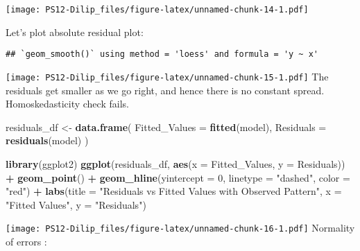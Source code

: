 \documentclass[
]{article}
\newenvironment{Shaded}{\begin{snugshade}}{\end{snugshade}}
\newcommand{\AttributeTok}[1]{\textcolor[rgb]{0.13,0.29,0.53}{#1}}
\newcommand{\DecValTok}[1]{\textcolor[rgb]{0.00,0.00,0.81}{#1}}
\newcommand{\FunctionTok}[1]{\textcolor[rgb]{0.13,0.29,0.53}{\textbf{#1}}}
\newcommand{\NormalTok}[1]{#1}
\newcommand{\OtherTok}[1]{\textcolor[rgb]{0.56,0.35,0.01}{#1}}
\newcommand{\SpecialCharTok}[1]{\textcolor[rgb]{0.81,0.36,0.00}{\textbf{#1}}}
\newcommand{\StringTok}[1]{\textcolor[rgb]{0.31,0.60,0.02}{#1}}
\begin{document}
\texttt{[image: PS12-Dilip\_files/figure-latex/unnamed-chunk-14-1.pdf]}

Let's plot absolute residual plot:

\begin{Shaded}
\end{Shaded}

\begin{verbatim}
## `geom_smooth()` using method = 'loess' and formula = 'y ~ x'
\end{verbatim}

\texttt{[image: PS12-Dilip\_files/figure-latex/unnamed-chunk-15-1.pdf]}
The residuals get smaller as we go right, and hence there is no constant
spread. Homoskedasticity check fails.

\begin{Shaded}
\begin{Highlighting}[]
\NormalTok{residuals\_df }\OtherTok{\textless{}{-}} \FunctionTok{data.frame}\NormalTok{(}
  \AttributeTok{Fitted\_Values =} \FunctionTok{fitted}\NormalTok{(model),}
  \AttributeTok{Residuals =} \FunctionTok{residuals}\NormalTok{(model)}
\NormalTok{)}

\FunctionTok{library}\NormalTok{(ggplot2)}
\FunctionTok{ggplot}\NormalTok{(residuals\_df, }\FunctionTok{aes}\NormalTok{(}\AttributeTok{x =}\NormalTok{ Fitted\_Values, }\AttributeTok{y =}\NormalTok{ Residuals)) }\SpecialCharTok{+}
  \FunctionTok{geom\_point}\NormalTok{() }\SpecialCharTok{+}
  \FunctionTok{geom\_hline}\NormalTok{(}\AttributeTok{yintercept =} \DecValTok{0}\NormalTok{, }\AttributeTok{linetype =} \StringTok{"dashed"}\NormalTok{, }\AttributeTok{color =} \StringTok{"red"}\NormalTok{) }\SpecialCharTok{+}
  \FunctionTok{labs}\NormalTok{(}\AttributeTok{title =} \StringTok{"Residuals vs Fitted Values with Observed Pattern"}\NormalTok{,}
       \AttributeTok{x =} \StringTok{"Fitted Values"}\NormalTok{,}
       \AttributeTok{y =} \StringTok{"Residuals"}\NormalTok{)}
\end{Highlighting}
\end{Shaded}

\texttt{[image: PS12-Dilip\_files/figure-latex/unnamed-chunk-16-1.pdf]}
Normality of errors :
\end{document}
